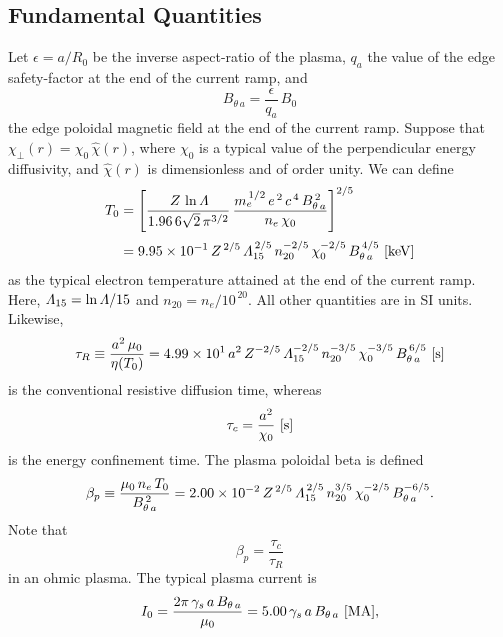 \documentclass[12pt,prb,aps]{revtex4-1}
\begin{document}
 \subsection{Fundamental Quantities}
 Let $\epsilon= a/R_0$ be the inverse aspect-ratio of the plasma, $q_a$ the value of the edge safety-factor at the end of the current ramp, and 
 \begin{equation}
 B_{\theta\,a}= \frac{\epsilon}{q_a}\,B_0
 \end{equation}
 the edge poloidal magnetic field at the end of the current ramp. Suppose that $\chi_\perp (r)= \chi_0\,\hat{\chi}(r)$, where $\chi_0$ is a
 typical value of the perpendicular energy diffusivity, and $\hat{\chi}(r)$ is dimensionless and of order unity. 
 We can define
 \begin{align}
 T_0&= \left[\frac{\,Z\,\ln{\mit\Lambda}}{1.96\,6\sqrt{2}\,\pi^{3/2}}\,\frac{m_e^{\,1/2}\,e^{\,2}\,c^{\,4}\,B_{\theta\,a}^{\,2}}{n_e\,\chi_0}\right]^{2/5}\\[0.5ex]
 &= 9.95\times 10^{-1}\,Z^{\,2/5}\,{\mit\Lambda}_{15}^{\,2/5}\,n_{20}^{-2/5}\,\chi_0^{-2/5}\,B_{\theta\,a}^{\,4/5}\,\,[{\rm keV}]
 \end{align}
 as the typical electron temperature attained at the end of the current ramp. Here, ${\mit\Lambda}_{15}=\ln{\mit\Lambda}/15$ and $n_{20}=n_e/10^{\,20}$. 
 All other quantities are in SI units. Likewise, 
 \begin{equation}
 \tau_R \equiv \frac{a^2\,\mu_0}{\eta(T_0)}= 4.99\times 10^1\,a^2\,Z^{-2/5}\,{\mit\Lambda}_{15}^{-2/5}\,n_{20}^{-3/5}\,\chi_0^{-3/5}\,B_{\theta\,a}^{\,6/5}\,\,[{\rm s}]
 \end{equation}
 is the conventional resistive diffusion time, whereas 
 \begin{equation}
 \tau_c= \frac{a^2}{\chi_0}\,\,[{\rm s}]
 \end{equation}
 is the energy confinement time. The plasma poloidal beta is defined
 \begin{equation}\label{e16}
 \beta_p\equiv \frac{\mu_0\,n_e\,T_0}{B_{\theta\,a}^{\,2}} =  2.00\times 10^{-2}\,Z^{\,2/5}\,{\mit\Lambda}_{15}^{\,2/5}\,n_{20}^{3/5}\,\chi_0^{-2/5}\,B_{\theta\,a}^{-6/5}.
 \end{equation}
 Note that
 \begin{equation}\label{e17}
 \beta_p = \frac{\tau_c}{\tau_R}
 \end{equation}
 in an ohmic plasma. 
 The typical plasma current is
 \begin{equation}
 I_0= \frac{2\pi\,\gamma_s\,a\,B_{\theta\,a}}{\mu_0} = 5.00\,\gamma_s\,a\,B_{\theta\,a}\,\,[{\rm MA}],
 \end{equation}
\end{document}
